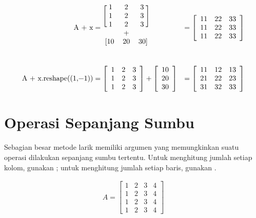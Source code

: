 \begin{align*}
\text{\li{A + x}}
&= \begin{blockarray}{ccc}
\begin{block}{[ccc]}
1 & 2 & 3\\
1 & 2 & 3\\
1 & 2 & 3\\
\end{block}
  & + &  \\
\begin{block}{[ccc]}
10 & 20 & 30\\
\end{block}
\end{blockarray}
&= \left[\begin{array}{ccc}
11 & 22 & 33\\
11 & 22 & 33\\
11 & 22 & 33
\end{array}\right]
\\ \\
\text{\li{A + x.reshape((1,-1))}}
&= \left[\begin{array}{ccc}
1 & 2 & 3 \\
1 & 2 & 3 \\
1 & 2 & 3 \\
\end{array}\right]
+ \left[\begin{array}{c}
10 \\ 20 \\ 30\\
\end{array}\right]
&= \left[\begin{array}{ccc}
11 & 12 & 13\\
21 & 22 & 23\\
31 & 32 & 33\\
\end{array}\right]
\end{align*}

\section*{Operasi Sepanjang Sumbu} %

Sebagian besar metode larik memiliki argumen  yang memungkinkan suatu operasi dilakukan sepanjang sumbu tertentu.
Untuk menghitung jumlah setiap kolom, gunakan ; untuk menghitung jumlah setiap baris, gunakan .

\begin{align*}
A = \left[\begin{array}{cccc}
1 & 2 & 3 & 4\\
1 & 2 & 3 & 4\\
1 & 2 & 3 & 4\\
1 & 2 & 3 & 4
\end{array}\right]
\end{align*}

